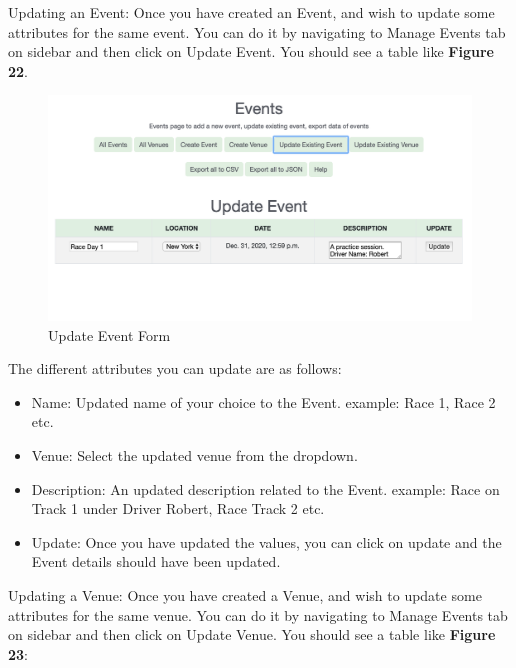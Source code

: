 \documentclass[12pt, letterpaper]{article}
\begin{document}
{{{{{{{{{\par Updating an Event: Once you have created an Event, and wish to update some attributes for the same event. You can do it by navigating to Manage Events tab on sidebar and then click on Update Event. You should see a table like \textbf{Figure 22}. \\
\begin{figure}[h!]
	\centering
	\includegraphics[width=1\columnwidth]{assets/update_event.png}
	\caption{Update Event Form}
	\end{figure}	
The different attributes you can update are as follows:
\begin{itemize}
	\item Name: Updated name of your choice to the Event. example: Race 1, Race 2 etc.
	\item Venue: Select the updated venue from the dropdown.
	\item Description: An updated description related to the Event. example: Race on Track 1 under Driver Robert, Race Track 2 etc.
	\item Update: Once you have updated the values, you can click on update and the Event details should have been updated.
\end{itemize}

 \par Updating a Venue: Once you have created a Venue, and wish to update some attributes for the same venue. You can do it by navigating to Manage Events tab on sidebar and then click on Update Venue. You should see a table like \textbf{Figure 23}:
	
}}}}}}}}}
\end{document}

